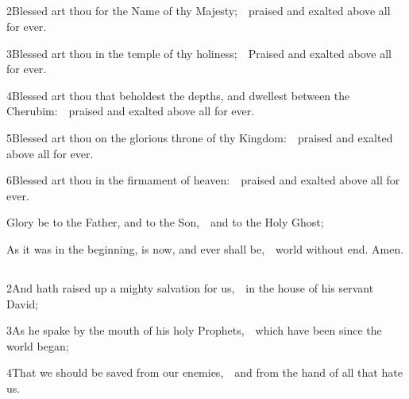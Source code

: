 \subsection{}

2\enspace Blessed art thou for the Name of thy Majesty;\ \star\ praised and exalted above all for ever.

3\enspace Blessed art thou in the temple of thy holiness;\ \star\ Praised and exalted above all for ever.

4\enspace Blessed art thou that beholdest the depths, and dwellest between the Cherubim:\ \star\ praised and exalted above all for ever.

5\enspace Blessed art thou on the glorious throne of thy Kingdom:\ \star\ praised and exalted above all for ever.

6\enspace Blessed art thou in the firmament of heaven:\ \star\ praised and exalted above all for ever.

Glory be to the Father, and to the Son,\ \star\ and to the Holy Ghost;

As it was in the beginning, is now, and ever shall be,\ \star\ world without end. Amen.

\subsubsection{}


\subsection{}


2\enspace And hath raised up a mighty salvation for us,\ \star\ in the house of his servant David;

3\enspace As he spake by the mouth of his holy Prophets,\ \star\ which have been since the world began;

4\enspace That we should be saved from our enemies,\ \star\ and from the hand of all that hate us.

